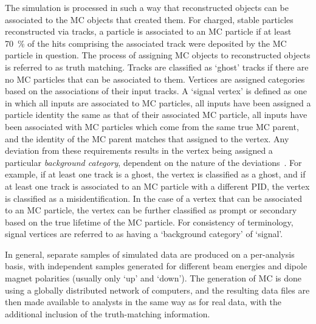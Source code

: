 The simulation is processed in such a way that reconstructed objects can be 
associated to the \ac{MC} objects that created them.
For charged, stable particles reconstructed via tracks, a particle is 
associated to an \ac{MC} particle if at least \SI{70}{\percent} of the hits 
comprising the associated track were deposited by the \ac{MC} particle in 
question.
The process of assigning \ac{MC} objects to reconstructed objects is referred 
to as truth matching.
Tracks are classified as `ghost' tracks if there are no \ac{MC} particles that 
can be associated to them.
Vertices are assigned categories based on the associations of their input 
tracks.
A `signal vertex' is defined as one in which all inputs are associated to 
\ac{MC} particles, all inputs have been assigned a particle identity the same 
as that of their associated \ac{MC} particle, all inputs have been associated 
with \ac{MC} particles which come from the same true \ac{MC} parent, and the 
identity of the \ac{MC} parent matches that assigned to the vertex.
Any deviation from these requirements results in the vertex being assigned a 
particular \emph{background category}, dependent on the nature of the 
deviations~\cite{Gligorov:1035682}.
For example, if at least one track is a ghost, the vertex is classified as a 
ghost, and if at least one track is associated to an \ac{MC} particle with a 
different \ac{PID}, the vertex is classified as a misidentification.
In the case of a vertex that can be associated to an \ac{MC} particle, the 
vertex can be further classified as prompt or secondary based on the true 
lifetime of the \ac{MC} particle.
For consistency of terminology, signal vertices are referred to as having a 
`background category' of `signal'.

In general, separate samples of simulated data are produced on a per-analysis 
basis, with independent samples generated for different beam energies and 
dipole magnet polarities (usually only `up' and `down').
The generation of \ac{MC} is done using a globally distributed network of 
computers, and the resulting data files are then made available to analysts in 
the same way as for real data, with the additional inclusion of the 
truth-matching information.

